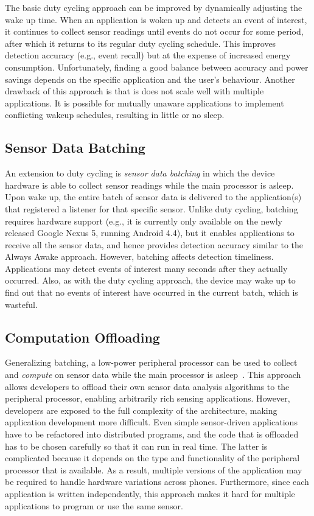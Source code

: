 The basic duty
cycling approach can be improved by dynamically adjusting the wake up time. When
an application is woken up and detects an event of interest, it continues to
collect sensor readings until events do not occur for some period, after which
it returns to its regular duty cycling schedule. This improves detection
accuracy (e.g., event recall) but at the expense of increased energy
consumption. Unfortunately, finding a good balance between accuracy and power
savings depends on the specific application and the user's behaviour. Another
drawback of this approach is that is does not scale well with multiple
applications. It is possible for mutually unaware applications to implement
conflicting wakeup schedules, resulting in little or no sleep.

\subsection{Sensor Data Batching}

An extension to duty cycling is \emph{sensor data batching} in which the device
hardware is able to collect sensor readings while the main processor is
asleep. Upon wake up, the entire batch of sensor data is delivered to the
application(s) that registered a listener for that specific sensor. Unlike duty
cycling, batching requires hardware support (e.g., it is currently only
available on the newly released Google Nexus 5, running Android 4.4), but it
enables applications to receive all the sensor data, and hence provides detection
accuracy similar to the Always Awake approach. However, batching affects detection
timeliness. Applications may detect events of interest many seconds after they
actually occurred. Also, as with the duty cycling approach, the device may wake
up to find out that no events of interest have occurred in the current batch, which 
is wasteful.

\subsection{Computation Offloading}
\label{subsec:computationOffloading}

Generalizing batching, a low-power peripheral processor can be used to
collect and \emph{compute} on sensor data while the main processor is
asleep~\cite{reflex,turducken}.  This approach allows developers to
offload their own sensor data analysis algorithms to the peripheral
processor, enabling arbitrarily rich sensing applications. However,
developers are exposed to the full complexity of the architecture,
making application development more difficult. Even simple
sensor-driven applications have to be refactored into distributed
programs, and the code that is offloaded has to be chosen
carefully so that it can run in real time. The latter is complicated
because it depends on the type and functionality of the peripheral
processor that is available. As a result, multiple versions of the
application may be required to handle hardware variations across
phones. Furthermore, since each application is written independently,
this approach makes it hard for multiple applications to program or
use the same sensor.

